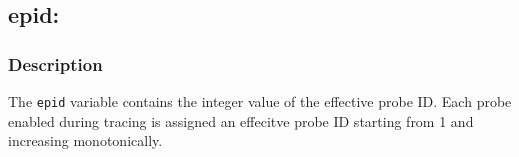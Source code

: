 \clearpage
{}
{}
\label{vars:epid}
\subsection*{epid: }

\subsubsection*{Description}

The \verb|epid| variable contains the integer value of the effective
probe ID.  Each probe enabled during tracing is assigned an effecitve
probe ID starting from 1 and increasing monotonically.


